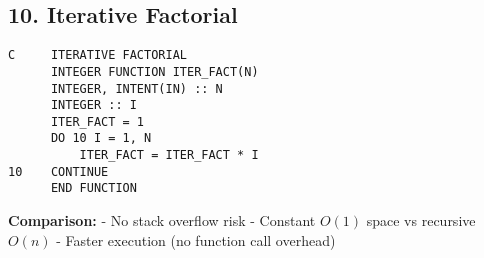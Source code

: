 \documentclass{book}
\begin{document}
\subsection*{10. Iterative Factorial}
\begin{verbatim}
C     ITERATIVE FACTORIAL
      INTEGER FUNCTION ITER_FACT(N)
      INTEGER, INTENT(IN) :: N
      INTEGER :: I
      ITER_FACT = 1
      DO 10 I = 1, N
          ITER_FACT = ITER_FACT * I
10    CONTINUE
      END FUNCTION
\end{verbatim}
\textbf{Comparison:}  
- No stack overflow risk  
- Constant \( O(1) \) space vs recursive \( O(n) \)  
- Faster execution (no function call overhead)  
\end{document}
